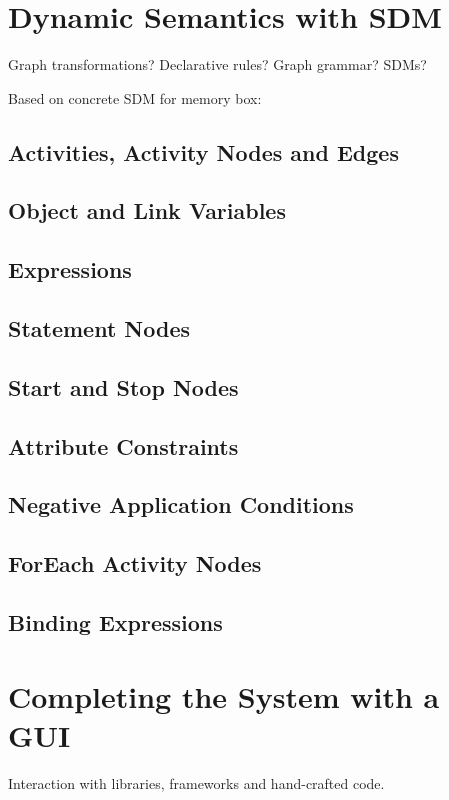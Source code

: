 \section{Dynamic Semantics with SDM}

Graph transformations?  Declarative rules?  Graph grammar?  SDMs?

Based on concrete SDM for memory box:

\subsection*{Activities, Activity Nodes and Edges}

\subsection*{Object and Link Variables}

\subsection*{Expressions}

\subsection*{Statement Nodes}

\subsection*{Start and Stop Nodes}

\subsection*{Attribute Constraints}

\subsection*{Negative Application Conditions}

\subsection*{ForEach Activity Nodes}

\subsection*{Binding Expressions}

\section{Completing the System with a GUI}

Interaction with libraries, frameworks and hand-crafted code.